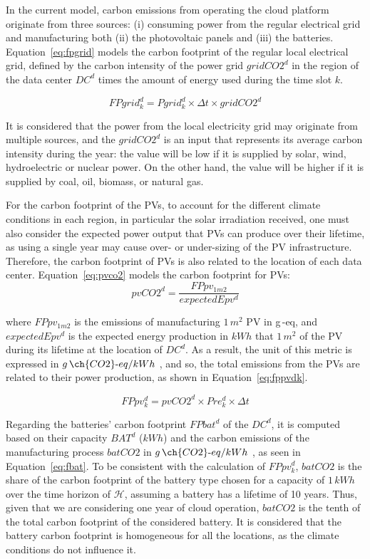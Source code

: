 In the current model, carbon emissions from operating the cloud platform originate from three sources: (i) consuming power from the regular electrical grid and manufacturing both (ii) the photovoltaic panels and (iii) the batteries. Equation~\eqref{eq:fpgrid} models the carbon footprint of the regular local electrical grid, defined by the carbon intensity of the power grid $gridCO2^d$ in the region of the data center $DC^d$  times the amount of energy used during the time slot $k$.

\begin{equation} \label{eq:fpgrid}
FPgrid_k^d = Pgrid_k^d\times \Delta t \times gridCO2^d
\end{equation}

It is considered that the power from the local electricity grid may originate from multiple sources, and the $gridCO2^d$ is an input that represents its average carbon intensity during the year: the value will be low if it is supplied by solar, wind, hydroelectric or nuclear power. On the other hand, the value will be higher if it is supplied by coal, oil, biomass, or natural gas.

For the carbon footprint of the PVs, to account for the different climate conditions in each region, in particular the solar irradiation received, one must also consider the expected power output that PVs can produce over their lifetime, as using a single year may cause over- or under-sizing of the PV infrastructure. Therefore, the carbon footprint of PVs is also related to the location of each data center. Equation~\eqref{eq:pvco2} models the carbon footprint for PVs:
\begin{equation} \label{eq:pvco2}
   pvCO2^d =  \frac{FPpv_{1m2}}{expectedEpv^d} 
\end{equation}

where $FPpv_{1m2}$ is the emissions of manufacturing $1\,m^2$ PV in g\,-eq, and $expectedEpv^d$ is the expected energy production in $kWh$ that $1\,m^2$ of the PV during its lifetime at the location of $DC^d$. As a result, the unit of this metric is expressed in $g\,\ch{CO2}\text{-}eq/kWh$ , and so, the total emissions from the PVs are related to their power production, as shown in Equation~\eqref{eq:fppvdk}.

\begin{equation} \label{eq:fppvdk}
   FPpv^d_k =  pvCO2^d \times Pre_k^d \times \Delta t
\end{equation}


Regarding the batteries' carbon footprint $FPbat^d$ of the $DC^d$, it is computed based on their capacity $BAT^d$ ($kWh$) and the carbon emissions of the manufacturing process $batCO2$ in $g\,\ch{CO2}\text{-}eq/kWh$ , as seen in Equation~\eqref{eq:fbat}. To be consistent with the calculation of $FPpv^d_k$, $batCO2$ is the share of the carbon footprint of the battery type chosen for a capacity of $1\,kWh$ over the time horizon of $\mathcal{H}$, assuming a battery has a lifetime of 10 years. Thus, given that we are considering one year of cloud operation, $batCO2$ is the tenth of the total carbon footprint of the considered battery. It is considered that the battery carbon footprint is homogeneous for all the locations, as the climate conditions do not influence it.

